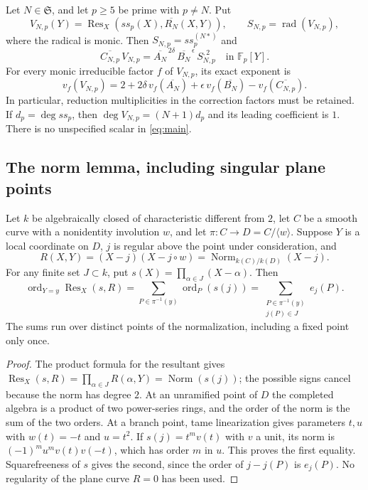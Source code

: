 \begin{theorem}\label{thm:main}
Let $N\in\mathfrak S$, and let $p\ge5$ be prime with $p\ne N$. Put
\[
 V_{N,p}(Y)=\operatorname{Res}_X(ss_p(X),\overline{R_N}(X,Y)),
 \qquad S_{N,p}=\operatorname{rad}(V_{N,p}),
\]
where the radical is monic. Then $S_{N,p}=ss_p^{(N*)}$ and
\begin{equation}\label{eq:main}
 \boxed{\quad \overline{C_{N,p}}\,V_{N,p}
       =\overline{A_N}^{\,2\delta}\,
        \overline{B_N}^{\,\epsilon}\,S_{N,p}^{,2}
        \quad\text{in }\mathbb F_p[Y].\quad}
\end{equation}
For every monic irreducible factor $f$ of $V_{N,p}$, its exact exponent is
\begin{equation}\label{eq:exponent}
 v_f(V_{N,p})=2+2\delta\,v_f(\overline{A_N})
                 +\epsilon\,v_f(\overline{B_N})
                 -v_f(\overline{C_{N,p}}).
\end{equation}
In particular, reduction multiplicities in the correction factors must be retained.
If $d_p=\deg ss_p$, then $\deg V_{N,p}=(N+1)d_p$ and its leading coefficient is $1$. There is no unspecified scalar in \eqref{eq:main}.
\end{theorem}

\subsection{The norm lemma, including singular plane points}
\begin{lemma}\label{lem:norm}
Let $k$ be algebraically closed of characteristic different from $2$, let $C$ be a smooth curve with a nonidentity involution $w$, and let $\pi:C\to D=C/\langle w\rangle$. Suppose $Y$ is a local coordinate on $D$, $j$ is regular above the point under consideration, and
\[
 R(X,Y)=(X-j)(X-j\circ w)
       =\operatorname{Norm}_{k(C)/k(D)}(X-j).
\]
For any finite set $J\subset k$, put $s(X)=\prod_{\alpha\in J}(X-\alpha)$. Then
\begin{equation}\label{eq:normorders}
 \operatorname{ord}_{Y=y}\operatorname{Res}_X(s,R)
 =\sum_{P\in\pi^{-1}(y)}\operatorname{ord}_P(s(j))
 =\sum_{\substack{P\in\pi^{-1}(y)\\j(P)\in J}}e_j(P).
\end{equation}
The sums run over distinct points of the normalization, including a fixed point only once.
\end{lemma}
\begin{proof}
The product formula for the resultant gives
$\operatorname{Res}_X(s,R)=\prod_{\alpha\in J}R(\alpha,Y)
=\operatorname{Norm}(s(j))$; the possible signs cancel because the norm has degree $2$.
At an unramified point of $D$ the completed algebra is a product of two power-series rings, and the order of the norm is the sum of the two orders. At a branch point, tame linearization gives parameters $t,u$ with $w(t)=-t$ and $u=t^2$. If $s(j)=t^m v(t)$ with $v$ a unit, its norm is $(-1)^m u^m v(t)v(-t)$, which has order $m$ in $u$. This proves the first equality. Squarefreeness of $s$ gives the second, since the order of $j-j(P)$ is $e_j(P)$. No regularity of the plane curve $R=0$ has been used.
\end{proof}

